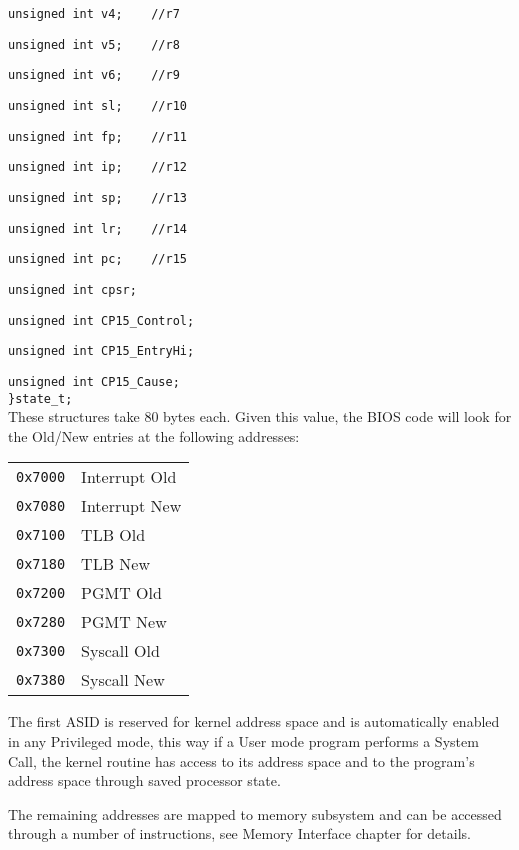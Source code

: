 \nopagebreak
\texttt{unsigned int v4;\ \ \ \ //r7}

\nopagebreak
\texttt{unsigned int v5;\ \ \ \ //r8}

\nopagebreak
\texttt{unsigned int v6;\ \ \ \ //r9}

\nopagebreak
\texttt{unsigned int sl;\ \ \ \ //r10}

\nopagebreak
\texttt{unsigned int fp;\ \ \ \ //r11}

\nopagebreak
\texttt{unsigned int ip;\ \ \ \ //r12}

\nopagebreak
\texttt{unsigned int sp;\ \ \ \ //r13}

\nopagebreak
\texttt{unsigned int lr;\ \ \ \ //r14}

\nopagebreak
\texttt{unsigned int pc;\ \ \ \ //r15}

\nopagebreak
\texttt{unsigned int cpsr;}

\nopagebreak
\texttt{unsigned int CP15\_Control;}

\nopagebreak
\texttt{unsigned int CP15\_EntryHi;}

\nopagebreak
\texttt{unsigned int CP15\_Cause;}\\
\nopagebreak
\texttt{\}state\_t; }
\\

These structures take 80 bytes each. Given this value, the BIOS code will look for the Old/New entries at the following addresses:
\\

\begin{tabular}{r|l}
\texttt{0x7000} & Interrupt Old \\
\texttt{0x7080} & Interrupt New \\
\texttt{0x7100} & TLB Old \\
\texttt{0x7180} & TLB New \\
\texttt{0x7200} & PGMT Old \\
\texttt{0x7280} & PGMT New \\
\texttt{0x7300} & Syscall Old \\
\texttt{0x7380} & Syscall New \\
\end{tabular}

The first ASID is reserved for kernel address space and is automatically enabled in any Privileged mode, this way if a User mode program performs a System Call, the kernel routine has access to its address space and to the program's address space through saved processor state.


The remaining addresses are mapped to memory subsystem and can be accessed through a number of instructions, see Memory Interface chapter for details.
